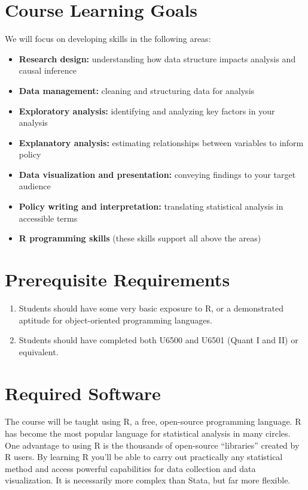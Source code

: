 \documentclass[11pt,]{article}
\begin{document}
\hypertarget{course-learning-goals}{%
\section{Course Learning Goals}\label{course-learning-goals}}

We will focus on developing skills in the following areas:

\begin{itemize}
\item
  \textbf{Research design:} understanding how data structure impacts
  analysis and causal inference
\item
  \textbf{Data management:} cleaning and structuring data for analysis
\item
  \textbf{Exploratory analysis:} identifying and analyzing key factors
  in your analysis
\item
  \textbf{Explanatory analysis:} estimating relationships between
  variables to inform policy
\item
  \textbf{Data visualization and presentation:} conveying findings to
  your target audience
\item
  \textbf{Policy writing and interpretation:} translating statistical
  analysis in accessible terms
\item
  \textbf{R programming skills} (these skills support all above the
  areas)
\end{itemize}

\hypertarget{prerequisite-requirements}{%
\section{Prerequisite Requirements}\label{prerequisite-requirements}}

\begin{enumerate}
\def\labelenumi{\arabic{enumi}.}
\item
  Students should have some very basic exposure to R, or a demonstrated
  aptitude for object-oriented programming languages.
\item
  Students should have completed both U6500 and U6501 (Quant I and II)
  or equivalent.
\end{enumerate}

\hypertarget{required-software}{%
\section{Required Software}\label{required-software}}

The course will be taught using R, a free, open-source programming
language. R has become the most popular language for statistical
analysis in many circles. One advantage to using R is the thousands of
open-source ``libraries'' created by R users. By learning R you'll be
able to carry out practically any statistical method and access powerful
capabilities for data collection and data visualization. It is
necessarily more complex than Stata, but far more flexible.
\end{document}
